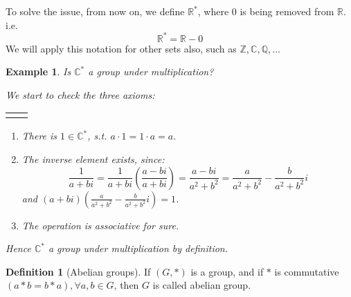 \documentclass{article}
\theoremstyle{MyNonumberplain}
\theoremstyle{break}
\newcommand{\R}{\mathbb{R}}
\newcommand{\Q}{\mathbb{Q}}
\newcommand{\Z}{\mathbb{Z}}
\newcommand{\C}{\mathbb{C}}
\theoremstyle{break}
\newtheorem{example}{Example}[section]
\theoremstyle{break}
\theoremstyle{definition}
\theoremstyle{break}
\newtheorem{definition}{Definition}[section]
\begin{document}
To solve the issue, from now on, we define $\R^*$, where $0$ is being removed from $\R$. i.e. 
$$\R^*=\R-{0}$$
We will apply this notation for other sets also, such as $\Z,\C,\Q,...$

\begin{expbox}
    \begin{example}
        Is $\C^*$ a group under multiplication?
        \begin{ansbox}
            We start to check the three axioms:

            \begin{tabular}{ll}
                &\\
            \end{tabular}
    
            \begin{enumerate}
                \item There is $1\in \C^*$, s.t. $a\cdot 1=1\cdot a=a.$\bigskip
                \item The inverse element exists, since:
                $$\frac{1}{a+bi}=\frac{1}{a+bi}\left(\frac{a-bi}{a+bi}\right)=\frac{a-bi}{a^2+b^2}=\frac{a}{a^2+b^2}-\frac{b}{a^2+b^2}i$$
                and $(a+bi)\left( \frac{a}{a^2+b^2}-\frac{b}{a^2+b^2}i\right)=1$.\bigskip
                \item The operation is associative for sure.\bigskip
            \end{enumerate}

            Hence $\C^*$ a group under multiplication by definition.
    
        \end{ansbox}
    \end{example}
\end{expbox}

\begin{defbox}
    \begin{definition}[Abelian groups]
        If $(G, \ast)$ is a group, and if $\ast$ is commutative $(a \ast b = b \ast a), \forall a, b \in G$, then $G$ is called abelian group.
    \end{definition}
\end{defbox}
\end{document}
